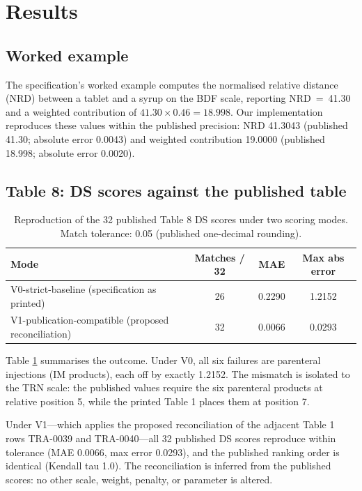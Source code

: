 \documentclass[12pt]{article}
\begin{document}
\section{Results}
\label{sec:results}

\subsection{Worked example}
\label{sec:results-worked}

The specification's worked example computes the normalised relative distance (NRD) between a tablet and a syrup on the BDF scale, reporting NRD~=~41.30 and a weighted contribution of $41.30 \times 0.46 = 18.998$. Our implementation reproduces these values within the published precision: NRD 41.3043 (published 41.30; absolute error 0.0043) and weighted contribution 19.0000 (published 18.998; absolute error 0.0020).

\subsection{Table 8: DS scores against the published table}
\label{sec:results-table8}

\begin{table}[htbp]
\centering\small
\caption{Reproduction of the 32 published Table 8 DS scores under two scoring modes. Match tolerance: 0.05 (published one-decimal rounding).}
\label{tab:table8}
\begin{tabular}{@{}lccc@{}}
\toprule
Mode & Matches / 32 & MAE & Max abs error \\
\midrule
V0-strict-baseline (specification as printed) & 26 & 0.2290 & 1.2152 \\
V1-publication-compatible (proposed reconciliation) & 32 & 0.0066 & 0.0293 \\
\bottomrule
\end{tabular}
\end{table}

Table \ref{tab:table8} summarises the outcome. Under V0, all six failures are parenteral injections (IM products), each off by exactly 1.2152. The mismatch is isolated to the TRN scale: the published values require the six parenteral products at relative position 5, while the printed Table 1 places them at position 7.

Under V1---which applies the proposed reconciliation of the adjacent Table 1 rows TRA-0039 and TRA-0040---all 32 published DS scores reproduce within tolerance (MAE 0.0066, max error 0.0293), and the published ranking order is identical (Kendall tau 1.0). The reconciliation is inferred from the published scores: no other scale, weight, penalty, or parameter is altered.
\end{document}
